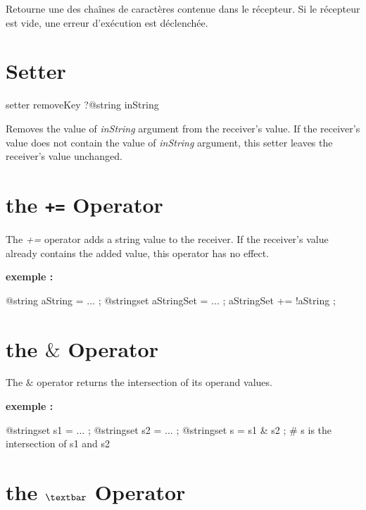 Retourne une des chaînes de caractères contenue dans le récepteur. Si le récepteur est vide, une erreur d'exécution est déclenchée.




\section{Setter}


\begin{galgascode}
setter removeKey ?@string inString
\end{galgascode}


Removes the value of \emph{inString} argument from the receiver's value. If the receiver's value does not contain the value of \emph{inString} argument, this setter leaves the receiver's value unchanged.






\section{the \texttt{+=} Operator}

The \emph{+=} operator adds a string value to the receiver. If the receiver's value already contains the added value, this operator has no effect.

\textbf{exemple :}
\begin{galgascode}
@string aString = ... ;
@stringset aStringSet = ... ;
aStringSet += !aString ;
\end{galgascode}




\section{the \emph{$\&$} Operator}

The \emph{$\&$} operator returns the intersection of its operand values.

\textbf{exemple :}
\begin{galgascode}
@stringset s1 = ... ;
@stringset s2 = ... ;
@stringset s = s1 & s2 ; # s is the intersection of s1 and s2
\end{galgascode}






\section{the \emph{$\textbar$} Operator}

